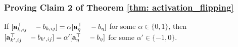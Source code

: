 \subsubsection{Proving Claim 2 of Theorem \ref{thm: activation_flipping}}
\begin{lemma} \label{lemma:flips}
If \newline $[\mathbf{a}_{k,ij}^\top\quad  -b_{k,ij}] = \alpha[\mathbf{a}_\eta^\top\quad -b_\eta]$ for some $\alpha \in \{0,1\}$, then $[\mathbf{a}_{k',ij}^\top\quad  -b_{k',ij}] = \alpha'[\mathbf{a}_\eta^\top\quad -b_\eta]$ for some $\alpha' \in \{-1,0\}$.
\end{lemma}
